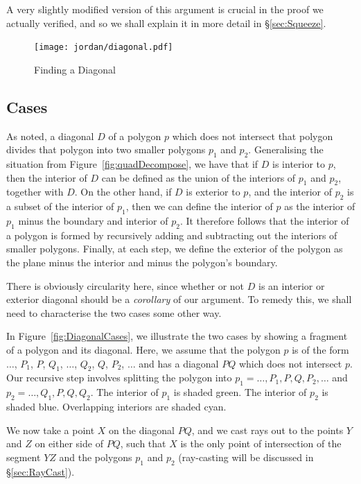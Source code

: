 A very slightly modified version of this argument is crucial in the proof we actually verified, and so we shall explain it in more detail in \S\ref{sec:Squeeze}.

\begin{figure}
\centering
\texttt{[image: jordan/diagonal.pdf]}
\caption{Finding a Diagonal}
\label{fig:SqueezeDemo}
\end{figure}

\subsection{Cases}
As noted, a diagonal $D$ of a polygon $p$ which does not intersect that polygon divides that polygon into two smaller polygons $p_1$ and $p_2$. Generalising the situation from Figure~\ref{fig:quadDecompose}, we have that if $D$ is interior to $p$, then the interior of $D$ can be defined as the union of the interiors of $p_1$ and $p_2$, together with $D$. On the other hand, if $D$ is exterior to $p$, and the interior of $p_2$ is a subset of the interior of $p_1$, then we can define the interior of $p$ as the interior of $p_1$ minus the boundary and interior of $p_2$. It therefore follows that the interior of a polygon is formed by recursively adding and subtracting out the interiors of smaller polygons. Finally, at each step, we define the exterior of the polygon as the plane minus the interior and minus the polygon's boundary.

There is obviously circularity here, since whether or not $D$ is an interior or exterior diagonal should be a \emph{corollary} of our argument. To remedy this, we shall need to characterise the two cases some other way.

In Figure~\ref{fig:DiagonalCases}, we illustrate the two cases by showing a fragment of a polygon and its diagonal. Here, we assume that the polygon $p$ is of the form $\ldots$, $P_1$, $P$, $Q_1$, $\ldots$, $Q_2$, $Q$, $P_2$, $\ldots$ and has a diagonal $PQ$ which does not intersect $p$. Our recursive step involves splitting the polygon into $p_1 = \ldots, P_1, P, Q, P_2, \ldots$ and $p_2 = \ldots, Q_1, P, Q, Q_2$. The interior of $p_1$ is shaded green. The interior of $p_2$ is shaded blue. Overlapping interiors are shaded cyan.

We now take a point $X$ on the diagonal $PQ$, and we cast rays out to the points $Y$ and $Z$ on either side of $PQ$, such that $X$ is the only point of intersection of the segment $YZ$ and the polygons $p_1$ and $p_2$ (ray-casting will be discussed in \S\ref{sec:RayCast}). 

